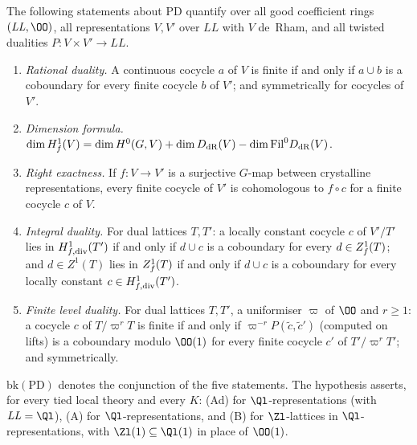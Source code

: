 \begin{definition}\label{pf:sh-hodge:def-bk}
The following statements about $\mathrm{PD}$ quantify over all good coefficient rings $(\mathit{LL},\OO)$, all representations $V,V'$
over $\mathit{LL}$ with $V$ de~Rham, and all twisted dualities $P\colon V\times V'\to\mathit{LL}$.
\begin{enumerate}
\item[(A)] \emph{Rational duality.} A continuous cocycle $a$ of $V$ is finite if and only if $a\cup b$ is a coboundary for every finite
  cocycle $b$ of $V'$; and symmetrically for cocycles of $V'$.
\item[(Ad)] \emph{Dimension formula.} $\dim H^1_{f}(V)=\dim H^0(G,V)+\dim D_{\mathrm{dR}}(V)-\dim\mathrm{Fil}^0D_{\mathrm{dR}}(V)$.
\item[(RE)] \emph{Right exactness.} If $f\colon V\to V'$ is a surjective $G$-map between crystalline representations, every finite
  cocycle of $V'$ is cohomologous to $f\circ c$ for a finite cocycle $c$ of $V$.
\item[(B)] \emph{Integral duality.} For dual lattices $T,T'$: a locally constant cocycle $c$ of $V'/T'$ lies in $H^1_{f,\mathrm{div}}(T')$ if and
  only if $d\cup c$ is a coboundary for every $d\in Z^1_{f}(T)$; and $d\in Z^1(T)$ lies in $Z^1_{f}(T)$ if and only if $d\cup c$ is a
  coboundary for every locally constant $c\in H^1_{f,\mathrm{div}}(T')$.
\item[(C)] \emph{Finite level duality.} For dual lattices $T,T'$, a uniformiser $\varpi$ of $\OO$ and $r\ge1$: a cocycle $c$ of
  $T/\varpi^rT$ is finite if and only if $\varpi^{-r}P(\tilde c,\tilde c')$ (computed on lifts) is a coboundary modulo $\OO(1)$ for every
  finite cocycle $c'$ of $T'/\varpi^rT'$; and symmetrically.
\end{enumerate}
$\mathrm{bk}(\mathrm{PD})$ denotes the conjunction of the five statements. The hypothesis \shhodgeBK{} asserts, for every tied local
theory and every $K$: (Ad) for $\Ql$-representations (with $\mathit{LL}=\Ql$), (A) for $\Ql$-representations, and (B) for $\Zl$-lattices
in $\Ql$-representations, with $\Zl(1)\subseteq\Ql(1)$ in place of $\OO(1)$.
\end{definition}

